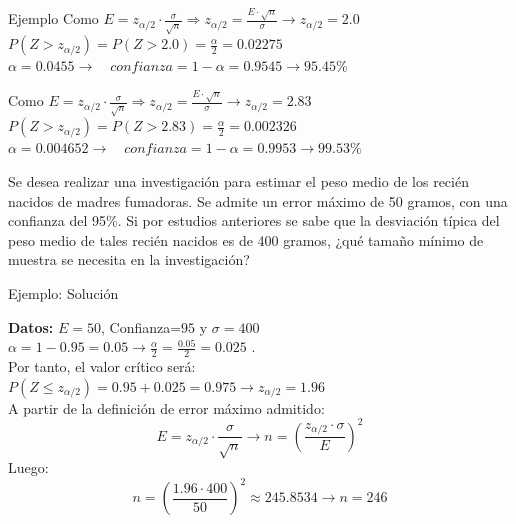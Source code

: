 \documentclass[11pt,handout]{beamer}
\begin{document}
\begin{frame}{Ejemplo}
Como $E=z_{\alpha / 2}\cdot \frac{\sigma}{\sqrt{n}} \Rightarrow z_{\alpha / 2} =\frac{E \cdot \sqrt{n}}{\sigma}\to z_{\alpha / 2}=2.0$ \\ $P(Z>z_{\alpha / 2})=P(Z>2.0)=\frac{\alpha}{2}=0.02275$ \\ $\alpha=0.0455 \to \quad confianza=1 - \alpha=0.9545 \to 95.45 \%$

Como $E=z_{\alpha / 2}\cdot \frac{\sigma}{\sqrt{n}} \Rightarrow z_{\alpha / 2} =\frac{E \cdot \sqrt{n}}{\sigma}\to z_{\alpha / 2}=2.83$ \\ $P(Z>z_{\alpha / 2})=P(Z>2.83)=\frac{\alpha}{2}=0.002326$ \\ $\alpha=0.004652 \to \quad confianza=1 - \alpha=0.9953 \to 99.53 \%$ 

\begin{block}{}
Se desea realizar una investigación para estimar el peso medio de los recién nacidos de madres fumadoras. Se admite un error máximo de 50 gramos, con una confianza del 95\%. Si por estudios anteriores se sabe que la desviación típica del peso medio de tales recién nacidos es de 400 gramos, ¿qué tamaño mínimo de muestra se necesita en la investigación?
\end{block}
    
\end{frame}{}


\begin{frame}{Ejemplo: Solución}

    \textbf{Datos:} $E=50$, Confianza=$95$ y $\sigma=400$ \\
$\alpha=1-0.95=0.05 \to \frac{\alpha}{2}=\frac{0.05}{2}=0.025$
. \\ Por tanto, el valor crítico será: \\
$P\left(Z \leqslant z_{\alpha / 2} \right)= 0.95 + 0.025 = 0.975 \to z_{\alpha / 2} = 1.96$\\ A partir de la definición de error máximo admitido:
$$E=z_{\alpha / 2}\cdot \frac{\sigma}{\sqrt{n}} \to 
n = \left( \frac{z_{\alpha / 2} \cdot \sigma}{E} \right) ^ 2$$
Luego: \\
$$n = \left( \frac{1.96 \cdot 400}{50} \right) ^ 2\approx 245.8534 \to n=246
$$
\end{frame}
\end{document}
